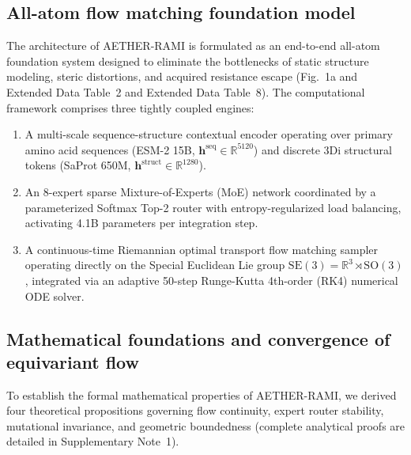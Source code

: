 \documentclass[11pt,a4paper]{article}
\begin{document}
\subsection*{All-atom flow matching foundation model}
The architecture of AETHER-RAMI is formulated as an end-to-end all-atom foundation system designed to eliminate the bottlenecks of static structure modeling, steric distortions, and acquired resistance escape (Fig.~1a and Extended Data Table~2 and Extended Data Table~8). The computational framework comprises three tightly coupled engines:
\begin{enumerate}
    \item A multi-scale sequence-structure contextual encoder operating over primary amino acid sequences (ESM-2 15B, $\mathbf{h}^{\text{seq}} \in \mathbb{R}^{5120}$) and discrete 3Di structural tokens (SaProt 650M, $\mathbf{h}^{\text{struct}} \in \mathbb{R}^{1280}$).
    \item An 8-expert sparse Mixture-of-Experts (MoE) network coordinated by a parameterized Softmax Top-2 router with entropy-regularized load balancing, activating 4.1B parameters per integration step.
    \item A continuous-time Riemannian optimal transport flow matching sampler operating directly on the Special Euclidean Lie group $\mathrm{SE}(3) = \mathbb{R}^3 \rtimes \mathrm{SO}(3)$, integrated via an adaptive 50-step Runge-Kutta 4th-order (RK4) numerical ODE solver.


\end{enumerate}

\subsection*{Mathematical foundations and convergence of equivariant flow}
To establish the formal mathematical properties of AETHER-RAMI, we derived four theoretical propositions governing flow continuity, expert router stability, mutational invariance, and geometric boundedness (complete analytical proofs are detailed in Supplementary Note~1).
\end{document}
